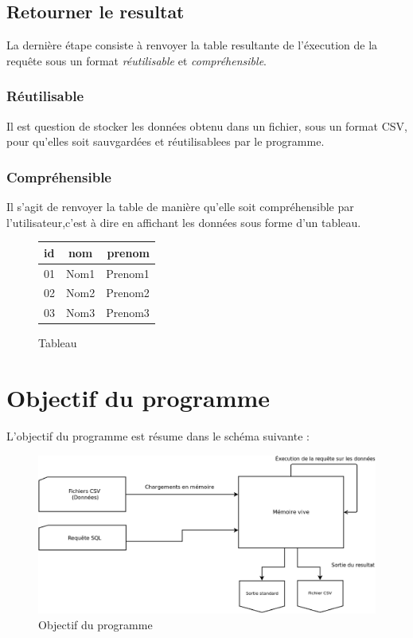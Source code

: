 \documentclass[oneside,13pt,a4paper]{report}
\begin{document}
\subsection{Retourner le resultat}

La dernière étape consiste à renvoyer la table resultante de l'éxecution de la requête sous un format \textit{réutilisable} et \textit{compréhensible}.

\subsubsection{Réutilisable}

Il est question de stocker les données obtenu dans un fichier, sous un format CSV, pour qu'elles soit sauvgardées et réutilisablees par le programme.

\pagebreak

\subsubsection{Compréhensible}

Il s'agit de renvoyer la table de manière qu'elle soit compréhensible par l'utilisateur,c'est à dire en affichant les données sous forme d'un tableau.

\begin{figure}[h!]
		\centering
		\caption{Tableau}
		\vspace{0.1cm}
		\begin{tabular}{|l|c|r|}
			\hline
			id   & nom  & prenom
			\\
			\hline
			01 & Nom1 &  Prenom1 \\
			02 & Nom2 &  Prenom2 \\
			03 & Nom3 &  Prenom3 \\
			\hline
		\end{tabular}
\end{figure}

\section{Objectif du programme}

L'objectif du programme est résume dans le schéma suivante :
\begin{figure}[!h]
	\centering
	\includegraphics[width=1\textwidth]{img/role_prog.png}
	\vspace{0.1cm}
	\caption{Objectif du programme}
\end{figure}
\end{document}
